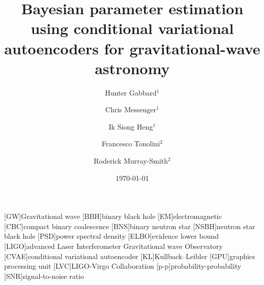 \documentclass[%
showpacs,
nofootinbib,
 amsmath,amssymb,
 aps,
 twocolumn,
 prl,
 reprint,
floatfix,
]{revtex4-1}
\begin{document}

\title{Bayesian parameter estimation using conditional variational autoencoders
for gravitational-wave astronomy}

\author{Hunter Gabbard$^1$}
\author{Chris Messenger$^1$}
\author{Ik Siong Heng$^1$}
\author{Francesco Tonolini$^2$}
\author{Roderick Murray-Smith$^2$}


\date{\today}

\maketitle

%

[GW]{Gravitational wave}
[BBH]{binary black hole}
[EM]{electromagnetic}
[CBC]{compact binary coalescence}
[BNS]{binary neutron star}
[NSBH]{neutron star black hole}
[PSD]{power spectral density}
[ELBO]{evidence lower bound}
[LIGO]{advanced Laser Interferometer Gravitational wave Observatory}
[CVAE]{conditional variational autoencoder}
[KL]{Kullback--Leibler}
[GPU]{graphics processing unit}
[LVC]{LIGO-Virgo Collaboration}
[p-p]{probability-probability}
[SNR]{signal-to-noise ratio}
\end{document}
